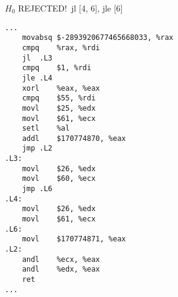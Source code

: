 \begin{figure}[H]
\begin{subfigure}[T]{0.30333333333333334\textwidth}
\begin{lrbox}{\mybox}
%
        \end{lrbox}\resizebox{\textwidth}{!}{\usebox{\mybox}}
\end{subfigure}
\begin{subfigure}[T]{0.30333333333333334\textwidth}
\caption*{}
\end{subfigure}
\begin{subfigure}[T]{0.30333333333333334\textwidth}
\caption*{}
\end{subfigure}
\hspace*{6mm}
\begin{subfigure}[T]{0.2733333333333333\textwidth}
\vspace*{2mm}\tiny {\color{red}$H_0$ REJECTED!}\ \vspace*{2mm}\tiny jl [4, 6], jle [6]
\begin{lstlisting}[style=defstyle,language={[x86masm]Assembler},basicstyle=\tiny\ttfamily,breaklines=true]
...
	movabsq	$-2893920677465668033, %rax
	cmpq	%rax, %rdi
	jl	.L3
	cmpq	$1, %rdi
	jle	.L4
	xorl	%eax, %eax
	cmpq	$55, %rdi
	movl	$25, %edx
	movl	$61, %ecx
	setl	%al
	addl	$170774870, %eax
	jmp	.L2
.L3:
	movl	$26, %edx
	movl	$60, %ecx
	jmp	.L6
.L4:
	movl	$26, %edx
	movl	$61, %ecx
.L6:
	movl	$170774871, %eax
.L2:
	andl	%ecx, %eax
	andl	%edx, %eax
	ret
...\end{lstlisting}
\end{subfigure}
\end{figure}
\newpage\noindent